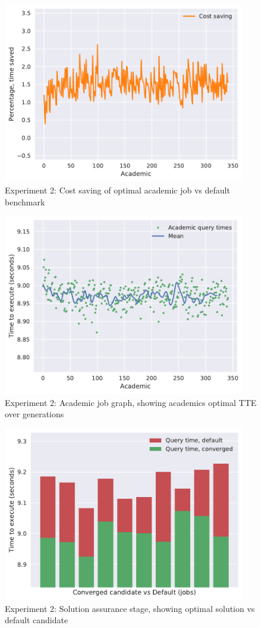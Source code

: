 \documentclass[a4paper,english]{report}
\begin{document}
	\begin{figure}[H]
		\centering
		\includegraphics[width=300pt]{runlogs/final7/2}
		\caption{Experiment 2: Cost saving of optimal academic job vs default benchmark}
		\label{fig:final22}
	\end{figure}
	\begin{figure}[H]
		\centering
		\includegraphics[width=300pt]{runlogs/final7/3}
		\caption{Experiment 2: Academic job graph, showing academics optimal TTE over generations}
		\label{fig:final23}
	\end{figure}
	\begin{figure}[H]
		\centering
		\includegraphics[width=300pt]{runlogs/final7/4}
		\caption{Experiment 2: Solution assurance stage, showing optimal solution vs default candidate}
		\label{fig:final24}
	\end{figure}
	\clearpage
\end{document}
